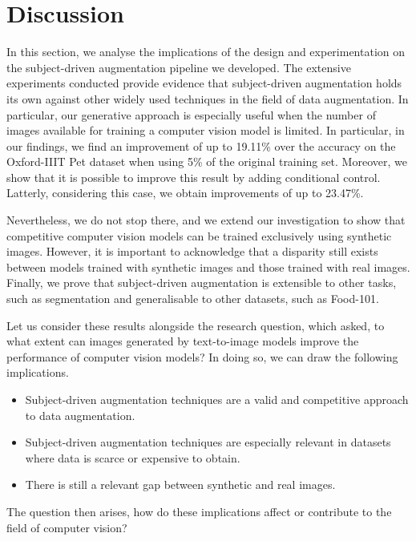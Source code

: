 \chapter{Discussion} \label{sec:discussion}

In this section, we analyse the implications of the design and experimentation on the subject-driven augmentation pipeline we developed. The extensive experiments conducted provide evidence that subject-driven augmentation holds its own against other widely used techniques in the field of data augmentation. In particular, our generative approach is especially useful when the number of images available for training a computer vision model is limited. In particular, in our findings, we find an improvement of up to 19.11\% over the accuracy on the Oxford-IIIT Pet dataset when using 5\% of the original training set. Moreover, we show that it is possible to improve this result by adding conditional control. Latterly, considering this case, we obtain improvements of up to 23.47\%. 

Nevertheless, we do not stop there, and we extend our investigation to show that competitive computer vision models can be trained exclusively using synthetic images. However, it is important to acknowledge that a disparity still exists between models trained with synthetic images and those trained with real images. Finally, we prove that subject-driven augmentation is extensible to other tasks, such as segmentation and generalisable to other datasets, such as Food-101.

Let us consider these results alongside the research question, which asked, to what extent can images generated by text-to-image models improve the performance of computer vision models? In doing so, we can draw the following implications.

\begin{itemize}
    \item Subject-driven augmentation techniques are a valid and competitive approach to data augmentation.
    \item Subject-driven augmentation techniques are especially relevant in datasets where data is scarce or expensive to obtain.
    \item There is still a relevant gap between synthetic and real images.
\end{itemize}

The question then arises, how do these implications affect or contribute to the field of computer vision? 

